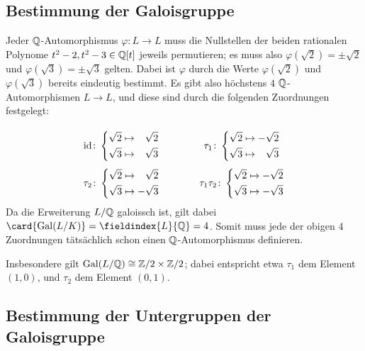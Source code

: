 \subsection{Bestimmung der Galoisgruppe}

Jeder $\mathbb{Q}$-Automorphismus $\varphi \colon L \to L$ muss die Nullstellen der beiden rationalen Polynome $t^2 - 2, t^2 - 3 \in \mathbb{Q}[t]$ jeweils permutieren;
es muss also $\varphi(\sqrt{2}) = \pm \sqrt{2}$ und $\varphi(\sqrt{3}) = \pm \sqrt{3}$ gelten.
Dabei ist $\varphi$ durch die Werte $\varphi(\sqrt{2})$ und $\varphi(\sqrt{3})$ bereits eindeutig bestimmt.
Es gibt also höchstens $4$ $\mathbb{Q}$-Automorphismen $L \to L$, und diese sind durch die folgenden Zuordnungen festgelegt:
\[
  \arraycolsep = 2em
  \renewcommand*{\arraystretch}{3}
  \begin{array}{cc}
  \id
  \colon
  \left\{
    \begin{aligned}
      \sqrt{2}  &\mapsto  \phantom{-}\sqrt{2}  \\
      \sqrt{3}  &\mapsto  \phantom{-}\sqrt{3}
    \end{aligned}
  \right.
  &
  \tau_1
  \colon
  \left\{
    \begin{aligned}
      \sqrt{2}  &\mapsto            -\sqrt{2}  \\
      \sqrt{3}  &\mapsto  \phantom{-}\sqrt{3}
    \end{aligned}
  \right.
  \\
  \tau_2
  \colon
  \left\{
    \begin{aligned}
      \sqrt{2}  &\mapsto  \phantom{-}\sqrt{2} \\
      \sqrt{3}  &\mapsto            -\sqrt{3}
    \end{aligned}
  \right.
  &
  \tau_1 \tau_2
  \colon
  \left\{
    \begin{aligned}
      \sqrt{2}  &\mapsto  -\sqrt{2} \\
      \sqrt{3}  &\mapsto  -\sqrt{3}
    \end{aligned}
  \right.
  \end{array}
\]
Da die Erweiterung $L/\mathbb{Q}$ galoissch ist, gilt dabei $\card{\Gal{L/K}} = \fieldindex{L}{\Rational} = 4$.
Somit muss jede der obigen $4$ Zuordnungen tätsächlich schon einen $\mathbb{Q}$-Automorphismus definieren.

Insbesondere gilt $\operatorname{Gal}(L/\mathbb{Q}) \cong \mathbb{Z}/2 \times \mathbb{Z}/2$;
dabei entspricht etwa $\tau_1$ dem Element $(1,0)$, und $\tau_2$ dem Element $(0,1)$.

\subsection{Bestimmung der Untergruppen der Galoisgruppe}

